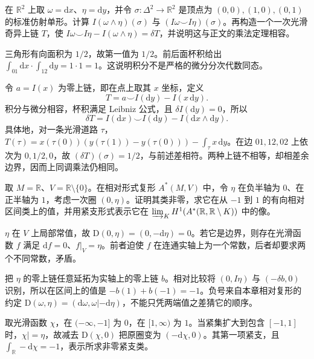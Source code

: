 \begin{exercise}\label{g2:ex:integration-not-strict-product}
	在 \(\mathbb R^2\) 上取 \(\omega=\mathrm dx\)、\(\eta=\mathrm dy\)，并令 \(\sigma:\Delta^2\to\mathbb R^2\) 是顶点为 \((0,0),(1,0),(0,1)\) 的标准仿射单形。计算 \(I(\omega\wedge\eta)(\sigma)\) 与 \((I\omega\smile I\eta)(\sigma)\)。再构造一个一次光滑奇异上链 \(T\)，使 \(I\omega\smile I\eta-I(\omega\wedge\eta)=\delta T\)，并说明这与正文的乘法定理相容。
\end{exercise}
\begin{solution}
	三角形有向面积为 \(1/2\)，故第一值为 \(1/2\)。前后面杯积给出 \(\int_{01}\mathrm dx\cdot\int_{12}\mathrm dy=1\cdot1=1\)。这说明积分不是严格的微分分次代数同态。

	令 \(a=I(x)\) 为零上链，即在点上取其 \(x\) 坐标，定义
	\[
		T=a\smile I(\mathrm dy)-I(x\,\mathrm dy).
	\]
	积分与微分相容，杯积满足 Leibniz 公式，且 \(\delta I(\mathrm dy)=0\)，所以
	\[
		\delta T=I(\mathrm dx)\smile I(\mathrm dy)-I(\mathrm dx\wedge\mathrm dy).
	\]
	具体地，对一条光滑道路 \(\tau\)，\(T(\tau)=x(\tau(0))(y(\tau(1))-y(\tau(0)))-\int_\tau x\,\mathrm dy\)。在边 \(01,12,02\) 上依次为 \(0,1/2,0\)，故 \((\delta T)(\sigma)=1/2\)，与前述差相符。两种上链不相等，却相差余边界，因而上同调乘法仍相同。
\end{solution}

\begin{exercise}\label{g2:ex:relative-cone-line}
	取 \(M=\mathbb R\)、\(V=\mathbb R\setminus\{0\}\)。在相对形式复形 \(A^*(M,V)\) 中，令 \(\eta\) 在负半轴为 \(0\)、在正半轴为 \(1\)，考虑一次圈 \((0,\eta)\)。证明其类非零，求它在从 \(-1\) 到 \(1\) 的有向相对区间类上的值，并用紧支形式表示它在 \(\varinjlim_KH^1(A^*(\mathbb R,\mathbb R\setminus K))\) 中的像。
\end{exercise}
\begin{solution}
	\(\eta\) 在 \(V\) 上局部常值，故 \(\mathrm D(0,\eta)=(0,-\mathrm d\eta)=0\)。若它是边界，则存在光滑函数 \(f\) 满足 \(\mathrm df=0\)、\(f|_V=\eta\)。前者迫使 \(f\) 在连通实轴上为一个常数，后者却要求两个不同常数，矛盾。

	把 \(\eta\) 的零上链任意延拓为实轴上的零上链 \(b\)。相对比较将 \((0,I\eta)\) 与 \((-\delta b,0)\) 识别，所以在区间上的值是 \(-b(1)+b(-1)=-1\)。负号来自本章相对复形的约定 \(\mathrm D(\omega,\eta)=(\mathrm d\omega,\omega|-\mathrm d\eta)\)，不能只凭两端值之差猜它的顺序。

	取光滑函数 \(\chi\)，在 \(( -\infty,-1]\) 为 \(0\)，在 \([1,\infty)\) 为 \(1\)。当紧集扩大到包含 \([-1,1]\) 时，\(\chi|=\eta\)，故减去 \(\mathrm D(\chi,0)\) 把原圈变为 \((-\mathrm d\chi,0)\)。其第一项紧支，且 \(\int_{\mathbb R}-\mathrm d\chi=-1\)，表示所求非零紧支类。
\end{solution}

